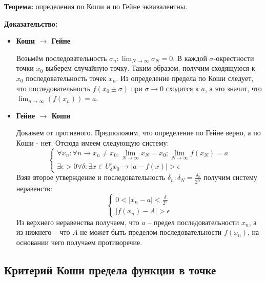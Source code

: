 \documentclass{article}
\begin{document}
\textbf{Теорема:} определения по Коши и по Гейне эквивалентны.

\textbf{Доказательство:}

\begin{itemize}
    \item \textbf{Коши $\rightarrow$ Гейне}
    
    Возьмём последовательность $\sigma_n : \lim_{N\rightarrow\infty}\sigma_N = 0$. В каждой $\sigma$-окрестности точки $x_0$ выберем случайную точку. Таким образом, получим сходящуюся к $x_0$ последовательность точек $x_n$. Из определение предела по Коши следует, что последовательность $f(x_0 \pm\sigma)$ при $\sigma\rightarrow 0$ сходится к $a$, а это значит, что $\lim_{n\rightarrow\infty}(f(x_n))=a$.
    
    \item \textbf{Гейне $\rightarrow$ Коши}
    
    Докажем от противного. Предположим, что определение по Гейне верно, а по Коши - нет. Отсюда имеем следующую систему:
    \begin{equation}
        \left\{\begin{matrix}
            \forall x_n : \forall n \rightarrow x_n \neq x_0, \lim_{N\rightarrow\infty}x_N = x_0; \lim_{N\rightarrow\infty}f(x_N) = a 
            \\ 
            \exists \epsilon > 0 \forall \delta: \exists x\in U^{\circ}_{\delta}x_0 \rightarrow |a - f(x)| > \epsilon
        \end{matrix}\right.
    \end{equation}
    Взяв второе утверждение и последовательность $\delta_n: \delta_N=\frac{\delta_0}{2^N}$ получим систему неравенств:
    \begin{equation}
        \left\{\begin{matrix}
            0<|x_n - a|<\frac{\delta}{2^n}
            \\
            |f(x_n)-A|>\epsilon
        \end{matrix}\right.
    \end{equation}
    Из верхнего неравенства получаем, что $a$ -- предел последовательности $x_n$, а из нижнего -- что $A$ не может быть пределом последовательности $f(x_n)$, на основании чего получаем противоречие.
\end{itemize}

\subsection{Критерий Коши предела функции в точке}
\end{document}
